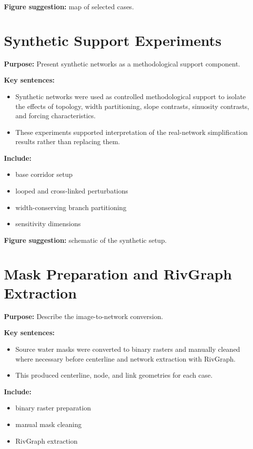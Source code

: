 \documentclass[11pt]{article}
\begin{document}
\textbf{Figure suggestion:} map of selected cases.

\section{Synthetic Support Experiments}
\textbf{Purpose:} Present synthetic networks as a methodological support component.

\textbf{Key sentences:}
\begin{itemize}
\item Synthetic networks were used as controlled methodological support to isolate the effects of topology, width partitioning, slope contrasts, sinuosity contrasts, and forcing characteristics.
\item These experiments supported interpretation of the real-network simplification results rather than replacing them.
\end{itemize}

\textbf{Include:}
\begin{itemize}
\item base corridor setup
\item looped and cross-linked perturbations
\item width-conserving branch partitioning
\item sensitivity dimensions
\end{itemize}

\textbf{Figure suggestion:} schematic of the synthetic setup.

\section{Mask Preparation and RivGraph Extraction}
\textbf{Purpose:} Describe the image-to-network conversion.

\textbf{Key sentences:}
\begin{itemize}
\item Source water masks were converted to binary rasters and manually cleaned where necessary before centerline and network extraction with RivGraph.
\item This produced centerline, node, and link geometries for each case.
\end{itemize}

\textbf{Include:}
\begin{itemize}
\item binary raster preparation
\item manual mask cleaning
\item RivGraph extraction
\end{itemize}
\end{document}
